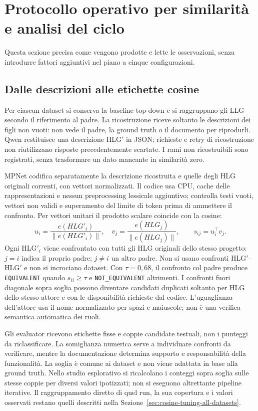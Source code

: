 \section{Protocollo operativo per similarit\`a e analisi del ciclo}
\label{sec:operational-experiment-protocol}
Questa sezione precisa come vengono prodotte e lette le osservazioni,
senza introdurre fattori aggiuntivi nel piano a cinque configurazioni.

\subsection{Dalle descrizioni alle etichette cosine}
Per ciascun dataset si conserva la baseline top-down e si raggruppano
gli LLG secondo il riferimento al padre. La ricostruzione riceve soltanto
le descrizioni dei figli non vuoti: non vede il padre, la ground truth
o il documento per riprodurli. Qwen restituisce una descrizione HLG$'$
in JSON; richieste e retry di ricostruzione non riutilizzano risposte
precedentemente scartate. I rami non ricostruibili sono registrati,
senza trasformare un dato mancante in similarit\`a zero.

MPNet codifica separatamente la descrizione ricostruita e quelle degli
HLG originali correnti, con vettori normalizzati. Il codice usa CPU,
cache delle rappresentazioni e nessun preprocessing lessicale aggiuntivo;
controlla testi vuoti, vettori non validi e superamento del limite di
token prima di ammettere il confronto. Per vettori unitari il prodotto
scalare coincide con la cosine:
\begin{equation}
u_i=\frac{e(HLG'_i)}{\|e(HLG'_i)\|},\quad
v_j=\frac{e(HLG_j)}{\|e(HLG_j)\|},\qquad s_{ij}=u_i^\top v_j.
\end{equation}
Ogni HLG$'_i$ viene confrontato con tutti gli HLG originali dello
stesso progetto: $j=i$ indica il proprio padre; $j\ne i$ un altro
padre. Non si usano confronti HLG$'$--HLG$'$ e non si incrociano dataset.
Con $\tau=0{,}68$, il confronto col padre produce
\texttt{EQUIVALENT} quando $s_{ii}\ge\tau$ e
\texttt{NOT\_EQUIVALENT} altrimenti. I confronti fuori diagonale
sopra soglia possono diventare candidati duplicati soltanto per HLG
dello stesso attore e con le disponibilit\`a richieste dal codice.
L'uguaglianza dell'attore usa il nome normalizzato per spazi e maiuscole;
non \`e una verifica semantica automatica dei ruoli.

Gli evaluator ricevono etichette fisse e coppie candidate testuali,
non i punteggi da riclassificare. La somiglianza numerica serve a
individuare confronti da verificare, mentre la documentazione determina
supporto e responsabilit\`a della funzionalit\`a. La soglia \`e comune
ai dataset e non viene adattata in base alla ground truth. Nello studio
esplorativo si ricalcolano i conteggi sopra soglia sulle stesse coppie
per diversi valori ipotizzati; non si eseguono altrettante pipeline
iterative. Il raggruppamento diretto di quel run, la sua copertura e
i valori osservati restano quelli descritti nella
Sezione~\ref{sec:cosine-tuning-all-datasets}.


